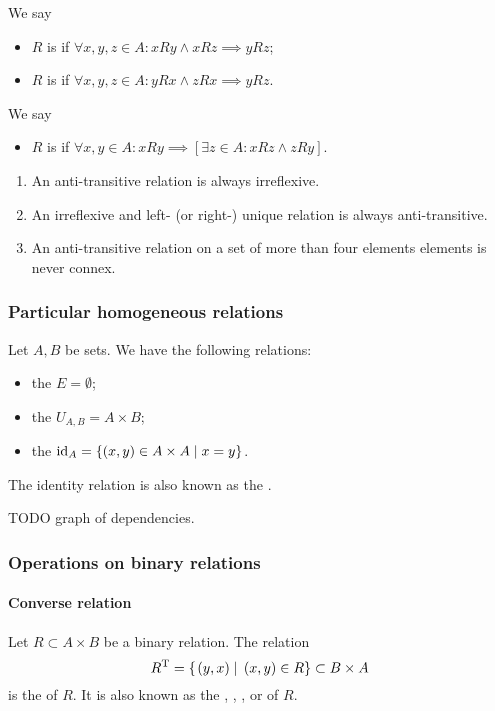 \begin{definition}
\begin{itemize}
\end{itemize}
We say
\begin{itemize}
\item $R$ is  if $\forall x,y,z\in A: xRy \land xRz \implies yRz$;
\item $R$ is  if $\forall x,y,z\in A: yRx \land zRx \implies yRz$.
\end{itemize}
We say
\begin{itemize}
\item $R$ is  if $\forall x,y\in A: xRy \implies [\exists z\in A: xRz \land zRy]$.
\end{itemize}
\end{definition}

\begin{lemma}
\begin{enumerate}
\item An anti-transitive relation is always irreflexive.
\item An irreflexive and left- (or right-) unique relation is always anti-transitive.
\item An anti-transitive relation on a set of more than four elements elements is never connex.
\end{enumerate}
\end{lemma}

\subsubsection{Particular homogeneous relations}
\begin{definition}
Let $A,B$ be sets. We have the following relations:
\begin{itemize}
\item the  $E=\emptyset$;
\item the  $U_{A,B}=A\times B$;
\item the  $\operatorname{id}_A=\{(x,y)\in A\times A\;|\; x=y \}$.
\end{itemize}
\end{definition}
The identity relation is also known as the .

TODO graph of dependencies.

\subsubsection{Operations on binary relations}
\paragraph{Converse relation}
\begin{definition}
Let $R\subset A\times B$ be a binary relation. The relation
\[ R^{\mathrm{T}} = \left\{\left. (y,x) \;\right|\; (x,y)\in R \right\} \subset B\times A \]
is the  of $R$. It is also known as the , , ,  or  of $R$.
\end{definition}

